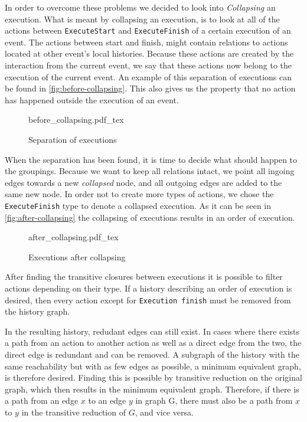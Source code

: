 	\newpar In order to overcome these problems we decided to look into \textit{Collapsing} an execution. What is meant by collapsing an execution, is to look at all of the actions between \texttt{ExecuteStart} and \texttt{ExecuteFinish} of a certain execution of an event. The actions between start and finish, might contain relations to actions located at other event's local histories. Because these actions are created by the interaction from the current event, we say that these actions now belong to the execution of the current event. An example of this separation of executions can be found in \autoref{fig:before-collapsing}. This also gives us the property that no action has happened outside the execution of an event.
	
	\begin{figure}
		\centering
		\def\svgwidth{0.42\columnwidth}
		\fontsize{6}{8}\selectfont
		{before_collapsing.pdf_tex}
		\caption{Separation of executions}
		\label{fig:before-collapsing}
	\end{figure}
	
	\newpar
	When the separation has been found, it is time to decide what should happen to the groupings. Because we want to keep all relations intact, we point all ingoing edges towards a new \textit{collapsed} node, and all outgoing edges are added to the same new node. In order not to create more types of actions, we chose the \texttt{ExecuteFinish} type to denote a collapsed execution. As it can be seen in \autoref{fig:after-collapsing} the collapsing of executions results in an order of execution.
	
	\begin{figure}
		\centering
		\def\svgwidth{0.22\columnwidth}
		\fontsize{6}{8}\selectfont
		{after_collapsing.pdf_tex}
		\caption{Executions after collapsing}
		\label{fig:after-collapsing}
	\end{figure}
	
	\newpar After finding the transitive closures between executions it is possible to filter actions depending on their type. If a history describing an order of execution is desired, then every action except for \texttt{Execution finish} must be removed from the history graph. 
	
	\newpar In the resulting history, redudant edges can still exist. In cases where there exists a path from an action to another action as well as a direct edge from the two, the direct edge is redundant and can be removed.	A subgraph of the history with the same reachability but with as few edges as possible, a minimum equivalent graph, is therefore desired. Finding this is possible by transitive reduction on the original graph, which then results in the minimum equivalent graph. Therefore, if there is a path from an edge $x$ to an edge $y$ in graph G, there must also be a path from $x$ to $y$ in the transitive reduction of $G$, and vice versa. 
	
